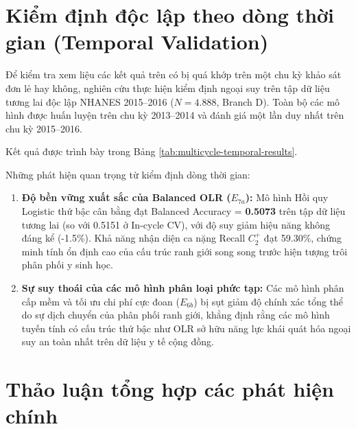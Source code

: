 \section{Kiểm định độc lập theo dòng thời gian (Temporal Validation)}
\label{sec:temporal-results}

Để kiểm tra xem liệu các kết quả trên có bị quá khớp trên một chu kỳ khảo sát đơn lẻ hay không, nghiên cứu thực hiện kiểm định ngoại suy trên tập dữ liệu tương lai độc lập NHANES 2015--2016 ($N = 4.888$, Branch D). Toàn bộ các mô hình được huấn luyện trên chu kỳ 2013--2014 và đánh giá một lần duy nhất trên chu kỳ 2015--2016.

Kết quả được trình bày trong Bảng \ref{tab:multicycle-temporal-results}.



Những phát hiện quan trọng từ kiểm định dòng thời gian:
\begin{enumerate}
    \item \textbf{Độ bền vững xuất sắc của Balanced OLR ($E_{7a}$):} Mô hình Hồi quy Logistic thứ bậc cân bằng đạt Balanced Accuracy = \textbf{0.5073} trên tập dữ liệu tương lai (so với 0.5151 ở In-cycle CV), với độ suy giảm hiệu năng không đáng kể (-1.5\%). Khả năng nhận diện ca nặng Recall $C_2^+$ đạt 59.30\%, chứng minh tính ổn định cao của cấu trúc ranh giới song song trước hiện tượng trôi phân phối y sinh học.
    \item \textbf{Sự suy thoái của các mô hình phân loại phức tạp:} Các mô hình phân cấp mềm và tối ưu chi phí cực đoan ($E_{6b}$) bị sụt giảm độ chính xác tổng thể do sự dịch chuyển của phân phối ranh giới, khẳng định rằng các mô hình tuyến tính có cấu trúc thứ bậc như OLR sở hữu năng lực khái quát hóa ngoại suy an toàn nhất trên dữ liệu y tế cộng đồng.
\end{enumerate}

\section{Thảo luận tổng hợp các phát hiện chính}
\label{sec:thao-luan-tong-hop}

